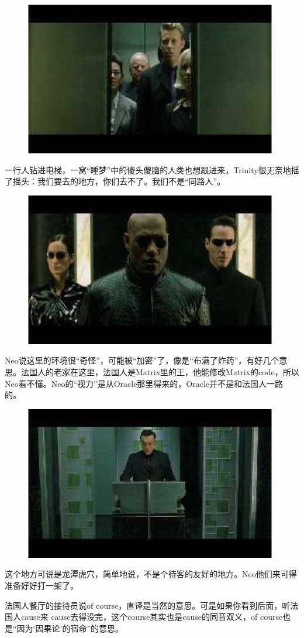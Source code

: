 \documentclass{ctexart}
\begin{document}
\begin{figure}[htb]
\centering
\includegraphics[width=0.5\linewidth]{fig/read_reloaded-87-1}
\end{figure}

一行人钻进电梯，一窝“睡梦”中的傻头傻脑的人类也想跟进来，Trinity很无奈地摇了摇头：我们要去的地方，你们去不了。我们不是“同路人”。

\begin{figure}[htb]
\centering
\includegraphics[width=0.5\linewidth]{fig/read_reloaded-88}
\end{figure}

Neo说这里的环境很“奇怪”，可能被“加密”了，像是“布满了炸药”，有好几个意思。法国人的老家在这里，法国人是Matrix里的王，他能修改Matrix的code，所以Neo看不懂。Neo的“视力”是从Oracle那里得来的，Oracle并不是和法国人一路的。

\begin{figure}[!htb]
\centering
\includegraphics[width=0.5\linewidth]{fig/read_reloaded-89}
\end{figure}

这个地方可说是龙潭虎穴，简单地说，不是个待客的友好的地方。Neo他们来可得准备好好打一架了。

法国人餐厅的接待员说of course，直译是当然的意思。可是如果你看到后面，听法国人cause来 cause去得没完，这个course其实也是cause的同音双义，of course也是“因为‘因果论’的宿命”的意思。
\end{document}
